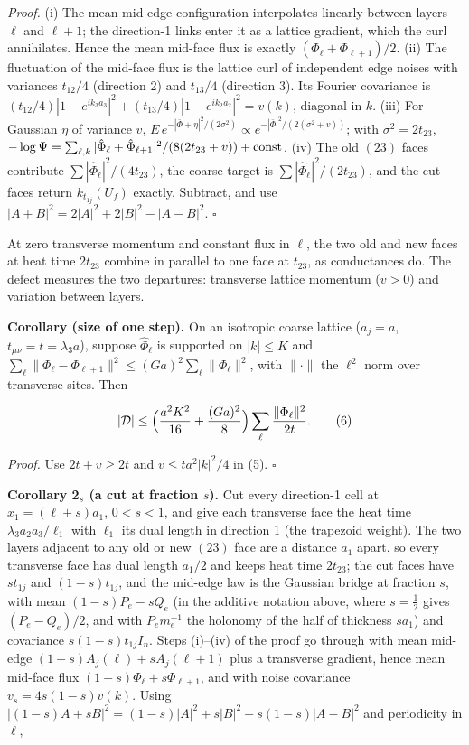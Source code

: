 \documentclass[11pt,a4paper]{article}
\begin{document}
\emph{Proof.} (i) The mean mid-edge configuration interpolates linearly
between layers \(\ell\) and \(\ell+1\); the direction-1 links enter it
as a lattice gradient, which the curl annihilates. Hence the mean
mid-face flux is exactly \((\Phi_\ell+\Phi_{\ell+1})/2\). (ii) The
fluctuation of the mid-face flux is the lattice curl of independent edge
noises with variances \(t_{12}/4\) (direction 2) and \(t_{13}/4\)
(direction 3). Its Fourier covariance is
\((t_{12}/4)|1-e^{ik_3a_3}|^2+(t_{13}/4)|1-e^{ik_2a_2}|^2=v(k)\),
diagonal in \(k\). (iii) For Gaussian \(\eta\) of variance \(v\),
\(E\,e^{-|\bar\Phi+\eta|^2/(2\sigma^2)}\propto e^{-|\bar\Phi|^2/(2(\sigma^2+v))}\);
with \(\sigma^2=2t_{23}\),
\(-\log\Psi=\sum_{\ell,k}|\hat\Phi_\ell+\hat\Phi_{\ell+1}|^2/ (8(2t_{23}+v))+{\rm const}\).
(iv) The old \((23)\) faces contribute
\(\sum|\hat\Phi_\ell|^2/(4t_{23})\), the coarse target is
\(\sum|\hat\Phi_\ell|^2/(2t_{23})\), and the cut faces return
\(k_{t_{1j}}(U_f)\) exactly. Subtract, and use
\(|A+B|^2=2|A|^2+2|B|^2-|A-B|^2\). \(\square\)

At zero transverse momentum and constant flux in \(\ell\), the two old
and new faces at heat time \(2t_{23}\) combine in parallel to one face
at \(t_{23}\), as conductances do. The defect measures the two
departures: transverse lattice momentum (\(v>0\)) and variation between
layers.

\textbf{Corollary (size of one step).} On an isotropic coarse lattice
(\(a_j=a\), \(t_{\mu\nu}=t=\lambda_3a\)), suppose \(\hat\Phi_\ell\) is
supported on \(|k|\le K\) and
\(\sum_\ell\|\Phi_\ell-\Phi_{\ell+1}\|^2\le(Ga)^2\sum_\ell\|\Phi_\ell\|^2\),
with \(\|\cdot\|\) the \(\ell^2\) norm over transverse sites. Then

\[|\mathcal D|\le\Bigl(\frac{a^2K^2}{16}+\frac{(Ga)^2}{8}\Bigr)
\sum_\ell\frac{\|\Phi_\ell\|^2}{2t}. \tag{6}\]

\emph{Proof.} Use \(2t+v\ge2t\) and \(v\le ta^2|k|^2/4\) in (5).
\(\square\)

\textbf{Corollary 2\(_s\) (a cut at fraction \(s\)).} Cut every
direction-1 cell at \(x_1=(\ell+s)a_1\), \(0<s<1\), and give each
transverse face the heat time \(\lambda_3a_2a_3/\ell_1\) with \(\ell_1\)
its dual length in direction 1 (the trapezoid weight). The two layers
adjacent to any old or new \((23)\) face are a distance \(a_1\) apart,
so every transverse face has dual length \(a_1/2\) and keeps heat time
\(2t_{23}\); the cut faces have \(st_{1j}\) and \((1-s)t_{1j}\), and the
mid-edge law is the Gaussian bridge at fraction \(s\), with mean
\((1-s)P_e-sQ_e\) (in the additive notation above, where \(s=\frac12\)
gives \((P_e-Q_e)/2\), and with \(P_em_e^{-1}\) the holonomy of the half
of thickness \(sa_1\)) and covariance \(s(1-s)t_{1j}I_n\). Steps
(i)--(iv) of the proof go through with mean mid-edge
\((1-s)A_j(\ell)+sA_j(\ell+1)\) plus a transverse gradient, hence mean
mid-face flux \((1-s)\Phi_\ell+s\Phi_{\ell+1}\), and with noise
covariance \(v_s=4s(1-s)v(k)\). Using
\(|(1-s)A+sB|^2=(1-s)|A|^2+s|B|^2-s(1-s)|A-B|^2\) and periodicity in
\(\ell\),
\end{document}
